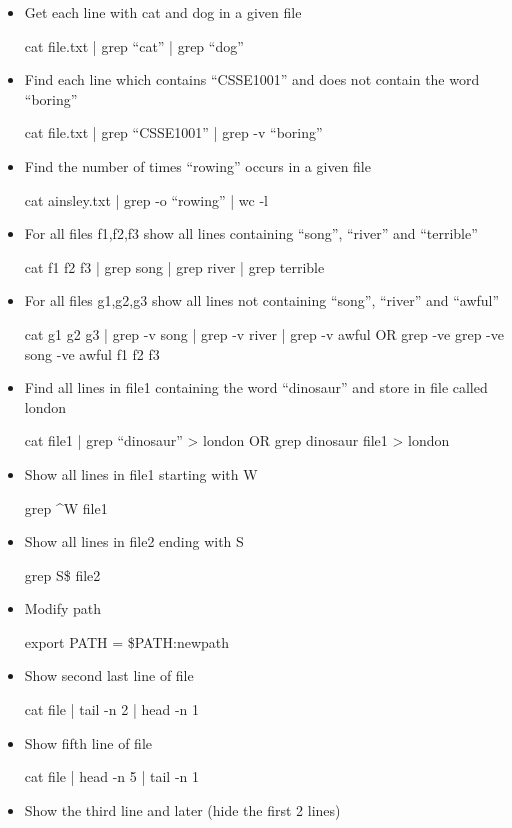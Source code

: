 \documentclass[10pt, a4paper]{article}
\begin{document}
\begin{multicols}{4}
\begin{itemize}
    \item Get each line with cat and dog in a given file

    cat file.txt | grep “cat” | grep “dog”

    \item Find each line which contains “CSSE1001” and does
    not contain the word “boring”

    cat file.txt | grep “CSSE1001” | grep -v “boring”

    \item Find the number of times “rowing” occurs
    in a given file

    cat ainsley.txt | grep -o “rowing” | wc -l

    \item For all files f1,f2,f3 show all lines containing
    “song”, “river” and “terrible”

    cat f1 f2 f3 | grep song | grep river
    | grep terrible

    \item For all files g1,g2,g3 show all lines not containing
    “song”, “river” and “awful”

    cat g1 g2 g3 | grep -v song | grep -v river 
    | grep -v awful
    OR	grep -ve grep -ve song -ve awful f1 f2 f3

    \item Find all lines in file1 containing the word
    “dinosaur” and store in file called london

    cat file1 | grep “dinosaur” > london  
    OR	grep dinosaur file1 > london

    \item Show all lines in file1 starting with W

    grep \^{}W file1

    \item Show all lines in file2 ending with S

    grep S\$ file2

    \item Modify path

    export PATH = \$PATH:newpath

    \item Show second last line of file

    cat file | tail -n 2 | head -n 1

    \item Show fifth line of file

    cat file | head -n 5 | tail -n 1

    \item Show the third line and later
    (hide the first 2 lines)


\end{itemize}
\end{multicols}
\end{document}
